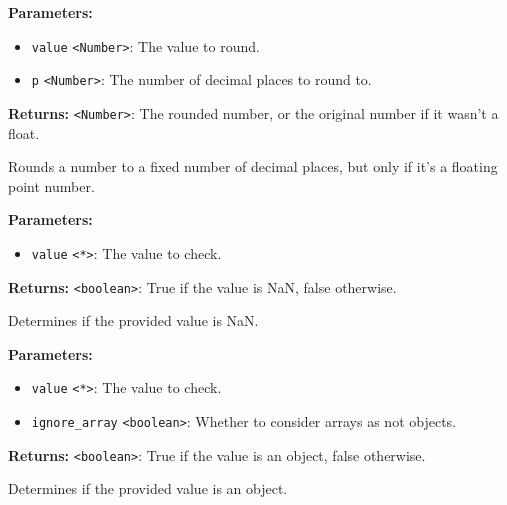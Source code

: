\documentclass[12pt,a4paper]{article}
\begin{document}
\noindent \textbf{Parameters:}
\begin{itemize}
  \item \texttt{value} \texttt{<Number>}: The value to round.
  \item \texttt{p} \texttt{<Number>}: The number of decimal places to round to.
\end{itemize}

\noindent \textbf{Returns:} \texttt{<Number>}: The rounded number, or the original number if it wasn't a float.

\noindent Rounds a number to a fixed number of decimal places, but only if it's a floating point number.

\vspace{5mm}
\noindent {}


\noindent \textbf{Parameters:}
\begin{itemize}
  \item \texttt{value} \texttt{<*>}: The value to check.
\end{itemize}

\noindent \textbf{Returns:} \texttt{<boolean>}: True if the value is NaN, false otherwise.

\noindent Determines if the provided value is NaN.

\vspace{5mm}
\noindent {}


\noindent \textbf{Parameters:}
\begin{itemize}
  \item \texttt{value} \texttt{<*>}: The value to check.
  \item \texttt{ignore\_array} \texttt{<boolean>}: Whether to consider arrays as not objects.
\end{itemize}

\noindent \textbf{Returns:} \texttt{<boolean>}: True if the value is an object, false otherwise.

\noindent Determines if the provided value is an object.

\vspace{5mm}
\noindent {}
\end{document}

